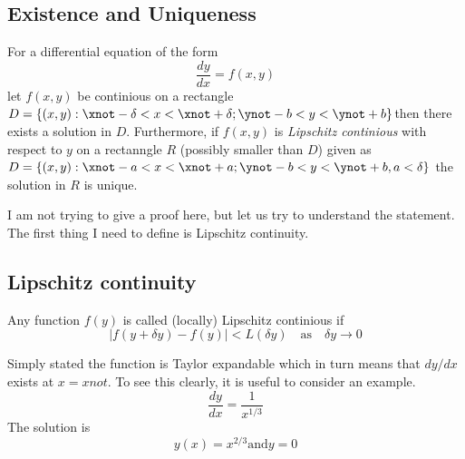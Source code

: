 \subsection{Existence and Uniqueness}
\begin{thm-non}
For a differential equation of the form 
\begin{equation}
\frac{dy}{dx} = f(x,y)
\end{equation}
let $f(x,y)$ be continious on a rectangle 
$D = \{(x,y): 
\xnot-\delta <x < \xnot +\delta ;
 \ynot-b <y < \ynot +b\} $then there exists a solution 
in $D$. Furthermore, if $f(x,y)$ is \textit{Lipschitz continious} with
respect to $y$ on a rectanngle $R$ (possibly smaller than $D$) given
as
$D = \{(x,y): 
\xnot-a <x < \xnot +a ;
 \ynot-b <y < \ynot +b, a<\delta \} $ the solution in $R$ is unique. 
\end{thm-non}
I am not trying to give a proof here, but let us try to understand the
statement. The first thing I need to define is Lipschitz continuity. 
\subsection{Lipschitz continuity}
\begin{def-non}
Any function $f(y)$ is called (locally) Lipschitz continious if 
\begin{equation}
\mid f(y+\delta y) - f(y) \mid < L (\delta y) \quad
\text{as}\quad \delta y \to 0
\end{equation}
\end{def-non}
Simply stated the function is Taylor expandable which in turn means
that $dy/dx$ exists at $x=xnot$. To see this clearly, it is useful to
consider an example. 
\begin{equation}
\frac{dy}{dx} = \frac{1}{x^{1/3}}
\end{equation}
The solution is 
\begin{equation}
y(x) = x^{2/3} \text{and} y = 0
\end{equation}
